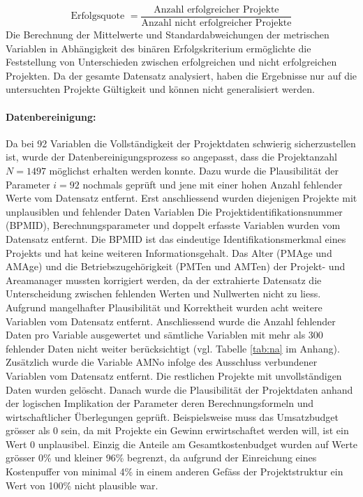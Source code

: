 \begin{equation*}
\text{Erfolgsquote } = \frac{\text{Anzahl erfolgreicher Projekte}}{\text{Anzahl nicht erfolgreicher Projekte}} 
\end{equation*}
Die Berechnung der Mittelwerte und Standardabweichungen der metrischen Variablen in Abhängigkeit des binären Erfolgskriterium ermöglichte die Feststellung von Unterschieden zwischen erfolgreichen und nicht erfolgreichen Projekten.
Da der gesamte Datensatz analysiert, haben die Ergebnisse nur auf die untersuchten Projekte Gültigkeit und können nicht generalisiert werden.
\paragraph{Datenbereinigung:} Da bei 92 Variablen die Vollständigkeit der Projektdaten schwierig sicherzustellen ist, wurde der Datenbereinigungsprozess so angepasst, dass die Projektanzahl $N = 1497$ möglichst erhalten werden konnte. Dazu wurde die Plausibilität der Parameter $i = 92$ nochmals geprüft und jene mit einer hohen Anzahl fehlender Werte vom Datensatz entfernt. Erst anschliessend wurden diejenigen Projekte mit unplausiblen und fehlender Daten Variablen 
\newline\newline
Die Projektidentifikationsnummer (BPMID), Berechnungsparameter und doppelt erfasste Variablen wurden vom Datensatz entfernt. Die BPMID ist das eindeutige Identifikationsmerkmal eines Projekts und hat keine weiteren Informationsgehalt. Das Alter (PMAge und AMAge) und die Betriebszugehörigkeit (PMTen und AMTen) der Projekt- und Areamanager mussten korrigiert werden, da der extrahierte Datensatz die Unterscheidung zwischen fehlenden Werten und Nullwerten nicht zu liess. Aufgrund mangelhafter Plausibilität und Korrektheit wurden acht weitere Variablen vom Datensatz entfernt. Anschliessend wurde die Anzahl fehlender Daten pro Variable ausgewertet und sämtliche Variablen mit mehr als 300 fehlender Daten nicht weiter berücksichtigt (vgl. Tabelle \ref{tab:na} im Anhang). Zusätzlich wurde die Variable AMNo infolge des Ausschluss verbundener Variablen vom Datensatz entfernt. Die restlichen Projekte mit unvollständigen Daten wurden gelöscht.
\newline\newline
Danach wurde die Plausibilität der Projektdaten anhand der logischen Implikation der Parameter deren Berechnungsformeln und wirtschaftlicher Überlegungen geprüft. Beispielsweise muss das Umsatzbudget grösser als 0 sein, da mit Projekte ein Gewinn erwirtschaftet werden will, ist ein Wert 0 unplausibel. Einzig die Anteile am Gesamtkostenbudget wurden auf Werte grösser 0\% und kleiner 96\% begrenzt, da aufgrund der Einreichung eines Kostenpuffer von minimal 4\% in einem anderen Gefäss der Projektstruktur ein Wert von 100\% nicht plausible war.
